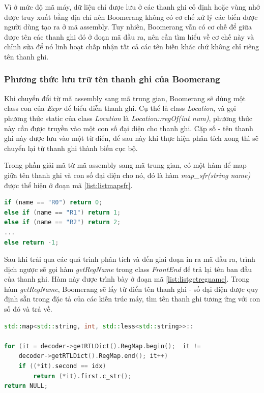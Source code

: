 Vì ở mức độ mã máy, dữ liệu chỉ được lưu ở các thanh ghi cố định hoặc vùng nhớ được truy xuất bằng địa chỉ nên Boomerang không có cơ chế xử lý các biến được người dùng tạo ra ở mã assembly. Tuy nhiên, Boomerang vẫn có cơ chế để giữa được tên các thanh ghi đó ở đoạn mã đầu ra, nên cần tìm hiểu về cơ chế này và chỉnh sửa để nó linh hoạt chấp nhận tất cả các tên biến khác chứ không chỉ riêng tên thanh ghi.

\subsubsection{Phương thức lưu trữ tên thanh ghi của Boomerang}
Khi chuyển đổi từ mã assembly sang mã trung gian, Boomerang sẽ dùng một class con của \textit{Expr} để biểu diễn thanh ghi. Cụ thể là class \textit{Location}, và gọi phương thức static của class \textit{Location} là \textit{Location::regOf(int num)}, phương thức này cần được truyền vào một con số đại diện cho thanh ghi. Cặp số - tên thanh ghi này được lưu vào một từ điển, để sau này khi thực hiện phân tích xong thì sẽ chuyển lại từ thanh ghi thành biến cục bộ.

Trong phần giải mã từ mã assembly sang mã trung gian, có một hàm để map giữa tên thanh ghi và con số đại diện cho nó, đó là hàm \textit{map\_sfr(string name)} được thể hiện ở đoạn mã \ref{list:listmapsfr}.
\begin{lstlisting}[caption={Một số phần mã trong hàm map\_sfr},label={list:listmapsfr},language=c++]
if (name == "R0") return 0;
else if (name == "R1") return 1;
else if (name == "R2") return 2;
...
else return -1;

\end{lstlisting}

Sau khi trải qua các quá trình phân tích và đến giai đoạn in ra mã đầu ra, trình dịch ngược sẽ gọi hàm \textit{getRegName} trong class \textit{FrontEnd} để trả lại tên ban đầu của thanh ghi. Hàm này được trình bày ở đoạn mã \ref{list:listgetregname}. Trong hàm \textit{getRegName}, Boomerang sẽ lấy từ điển tên thanh ghi - số đại diện được quy định sẵn trong đặc tả của các kiến trúc máy, tìm tên thanh ghi tương ứng với con số đó và trả về.
\begin{lstlisting}[caption={Phần mã trong hàm getRegName},label={list:listgetregname},language=c++]
std::map<std::string, int, std::less<std::string>>::
																				iterator it;
for (it = decoder->getRTLDict().RegMap.begin();	 it != 										
	decoder->getRTLDict().RegMap.end(); it++)
	if ((*it).second == idx) 
		return (*it).first.c_str();
return NULL;
\end{lstlisting}


